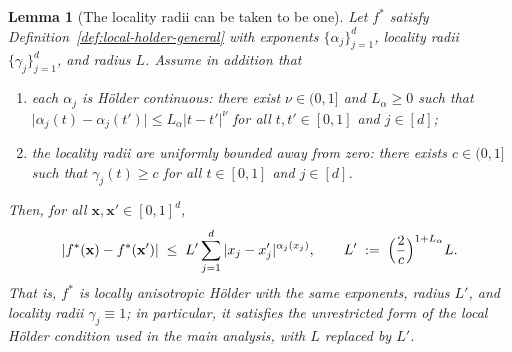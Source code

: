 \documentclass[11pt]{article}
\theoremstyle{plain}
\newtheorem{lemma}[theorem]{Lemma}
\theoremstyle{definition}
\theoremstyle{remark}
\theoremstyle{plain}
\newcommand{\bx}{\mathbf{x}}
\newcommand{\1}{\mathbbm{1}}
\begin{document}
\begin{lemma}[The locality radii can be taken to be one]
\label{lem:radius-one}
Let $f^*$ satisfy Definition~\ref{def:local-holder-general} with
exponents $\{\alpha_j\}_{j=1}^d$, locality radii
$\{\gamma_j\}_{j=1}^d$, and radius $L$. Assume in addition that
\begin{enumerate}
\item[(i)] each $\alpha_j$ is H\"older continuous: there exist
  $\nu\in(0,1]$ and $L_\alpha\ge0$ such that
  $\lvert\alpha_j(t)-\alpha_j(t')\rvert\le
  L_\alpha\lvert t-t'\rvert^{\nu}$
  for all $t,t'\in[0,1]$ and $j\in[d]$;
\item[(ii)] the locality radii are uniformly bounded away from zero:
  there exists $c\in(0,1]$ such that $\gamma_j(t)\ge c$ for all
  $t\in[0,1]$ and $j\in[d]$.
\end{enumerate}
Then, for \emph{all} $\bx,\bx'\in[0,1]^d$,
\[
|f^*(\bx)-f^*(\bx')|
\;\le\;
L'\sum_{j=1}^d |x_j-x_j'|^{\alpha_j(x_j)},
\qquad
L' \;:=\; \Bigl(\frac{2}{c}\Bigr)^{1+L_\alpha} L .
\]
That is, $f^*$ is locally anisotropic H\"older with the same
exponents, radius $L'$, and locality radii $\gamma_j\equiv 1$; in
particular, it satisfies the unrestricted form of the local H\"older
condition used in the main analysis, with $L$ replaced by $L'$.
\end{lemma}
\end{document}
